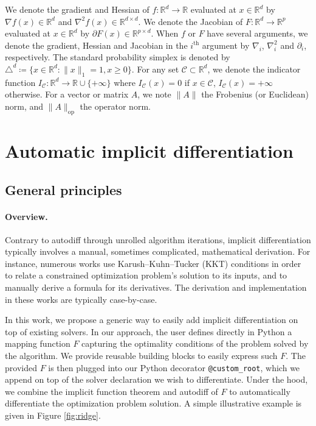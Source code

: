 \documentclass{article}
\def\cC{{\mathcal{C}}}
\def\RR{{\mathbb R}}
\begin{document}
We denote the gradient and Hessian of $f \colon \RR^d \to \RR$ evaluated at $x
\in \RR^d$ by $\nabla f(x) \in \RR^d$ and $\nabla^2 f(x) \in \RR^{d \times d}$.
We denote the Jacobian of $F \colon \RR^d \to \RR^p$ evaluated at $x \in \RR^d$
by $\partial F(x) \in \RR^{p \times d}$. When $f$ or $F$ have several arguments,
we denote the gradient, Hessian and Jacobian in the $i^{\text{th}}$ argument by
$\nabla_i$, $\nabla^2_i$ and $\partial_i$, respectively. The standard
probability simplex is denoted by $\triangle^d \coloneqq \{x \in \RR^d \colon
\|x\|_1 = 1, x \ge 0\}$. 
For any set $\cC\subset\RR^d$, we denote the indicator function $I_\cC \colon \RR^d
\rightarrow \RR\cup\{+\infty\}$ where $I_\cC(x) = 0$ if $x\in\cC$, $I_\cC(x) =
+\infty$ otherwise. For a vector or matrix $A$, we note $\|A\|$ the Frobenius
(or Euclidean) norm, and $\|A\|_{\text{op}}$ the operator norm.

\section{Automatic implicit differentiation}
\label{sec:framework}

\subsection{General principles}
\label{sec:general_principles}

\paragraph{Overview.}

Contrary to autodiff through unrolled algorithm iterations, implicit
differentiation typically involves a manual, sometimes complicated, mathematical
derivation.  For instance, numerous works \cite{chapelle_2002, gould_2016,
amos_2017,sparsemap,lp_sparsemap} use Karush–Kuhn–Tucker (KKT) conditions in
order to relate a constrained optimization problem's solution to its inputs, and
to manually derive a formula for its derivatives.  The derivation and
implementation in these works are typically case-by-case.

In this work, we propose a generic way to easily add implicit
differentiation on top of existing solvers. In our approach, the user defines
directly in Python a mapping function $F$ capturing
the optimality conditions of the problem solved by the algorithm.
We provide reusable building blocks to easily express such $F$.
The provided $F$ is then plugged into our Python decorator
\texttt{@custom\_root}, which we append on top of the solver declaration we wish to
differentiate.  Under the hood, we combine the implicit function theorem and
autodiff of $F$ to automatically differentiate the optimization problem
solution. A simple illustrative example is given in Figure \ref{fig:ridge}.
\end{document}
